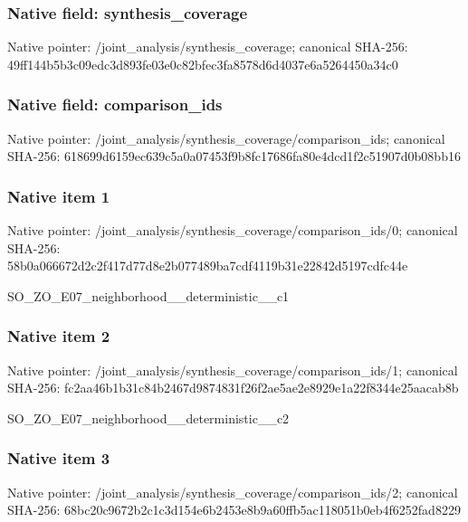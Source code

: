 \documentclass[10pt,a4paper]{article}
\begin{document}
\subsubsection{Native field: synthesis\_\allowbreak{}coverage}
Native pointer: /joint\_\allowbreak{}analysis/synthesis\_\allowbreak{}coverage; canonical SHA-256: 49ff144b5b3c09edc3d893fe03e0c82bfec3fa8578d6d4037e6a5264450a34c0

\subsubsection{Native field: comparison\_\allowbreak{}ids}
Native pointer: /joint\_\allowbreak{}analysis/synthesis\_\allowbreak{}coverage/comparison\_\allowbreak{}ids; canonical SHA-256: 618699d6159ec639c5a0a07453f9b8fc17686fa80e4dcd1f2c51907d0b08bb16

\subsubsection{Native item 1}
Native pointer: /joint\_\allowbreak{}analysis/synthesis\_\allowbreak{}coverage/comparison\_\allowbreak{}ids/0; canonical SHA-256: 58b0a066672d2c2f417d77d8e2b077489ba7cdf4119b31e22842d5197cdfc44e

\begingroup\raggedright\sloppy SO\_\allowbreak{}ZO\_\allowbreak{}E07\_\allowbreak{}neighborhood\_\allowbreak{}\_\allowbreak{}deterministic\_\allowbreak{}\_\allowbreak{}c1\par\endgroup

\subsubsection{Native item 2}
Native pointer: /joint\_\allowbreak{}analysis/synthesis\_\allowbreak{}coverage/comparison\_\allowbreak{}ids/1; canonical SHA-256: fc2aa46b1b31c84b2467d9874831f26f2ae5ae2e8929e1a22f8344e25aacab8b

\begingroup\raggedright\sloppy SO\_\allowbreak{}ZO\_\allowbreak{}E07\_\allowbreak{}neighborhood\_\allowbreak{}\_\allowbreak{}deterministic\_\allowbreak{}\_\allowbreak{}c2\par\endgroup

\subsubsection{Native item 3}
Native pointer: /joint\_\allowbreak{}analysis/synthesis\_\allowbreak{}coverage/comparison\_\allowbreak{}ids/2; canonical SHA-256: 68bc20c9672b2c1c3d154e6b2453e8b9a60ffb5ac118051b0eb4f6252fad8229
\end{document}

